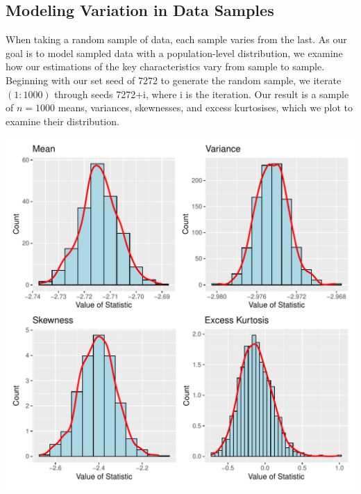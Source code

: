 \documentclass{article}\usepackage[]{graphicx}\usepackage[]{xcolor}
\makeatletter
\def\maxwidth{ %
  \ifdim\Gin@nat@width>\linewidth
    \linewidth
  \else
    \Gin@nat@width
  \fi
}
\newenvironment{knitrout}{}{} %
\makeatother
\begin{document}
\begin{multicols}{2}
\subsection{Modeling Variation in Data Samples}
When taking a random sample of data, each sample varies from the last. As our goal is to model sampled data with a population-level distribution, we examine how our estimations of the key characteristics vary from sample to sample. Beginning with our set seed of 7272 to generate the random sample, we iterate $(1:1000)$ through seeds 7272+i, where i is the iteration. Our result is a sample of $n = 1000$ means, variances, skewnesses, and excess kurtosises, which we plot to examine their distribution.

\begin{knitrout}\scriptsize
{}\color{fgcolor}
\includegraphics[width=\maxwidth]{figure/unnamed-chunk-3-1} 
\end{knitrout}


\end{multicols}
\end{document}
